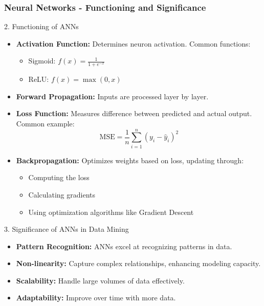 \documentclass[aspectratio=169]{beamer}
\begin{document}
\begin{frame}[fragile]
    \frametitle{Neural Networks - Functioning and Significance}
    \begin{block}{2. Functioning of ANNs}
        \begin{itemize}
            \item \textbf{Activation Function:} Determines neuron activation. Common functions:
                \begin{itemize}
                    \item Sigmoid: \( f(x) = \frac{1}{1 + e^{-x}} \)
                    \item ReLU: \( f(x) = \max(0, x) \)
                \end{itemize}
            \item \textbf{Forward Propagation:} Inputs are processed layer by layer.
            \item \textbf{Loss Function:} Measures difference between predicted and actual output. Common example:
                \[
                \text{MSE} = \frac{1}{n} \sum_{i=1}^{n} (y_i - \hat{y}_i)^2
                \]
            \item \textbf{Backpropagation:} Optimizes weights based on loss, updating through:
                \begin{itemize}
                    \item Computing the loss
                    \item Calculating gradients
                    \item Using optimization algorithms like Gradient Descent
                \end{itemize}
        \end{itemize}
    \end{block}

    \begin{block}{3. Significance of ANNs in Data Mining}
        \begin{itemize}
            \item \textbf{Pattern Recognition:} ANNs excel at recognizing patterns in data.
            \item \textbf{Non-linearity:} Capture complex relationships, enhancing modeling capacity.
            \item \textbf{Scalability:} Handle large volumes of data effectively.
            \item \textbf{Adaptability:} Improve over time with more data.
        \end{itemize}
    \end{block}
\end{frame}
\end{document}
